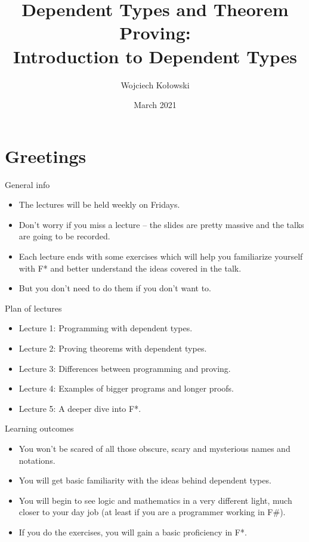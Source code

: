 \documentclass{beamer}
\title{Dependent Types and Theorem Proving: \\Introduction to Dependent Types}
\author{Wojciech Kołowski}
\date{March 2021}
\begin{document}
\frame{\titlepage}
\frame{\tableofcontents}

\section{Greetings}


\begin{frame}{General info}
\begin{itemize}
	\item The lectures will be held weekly on Fridays.
	\item Don't worry if you miss a lecture -- the slides are pretty massive and the talks are going to be recorded.
	\item Each lecture ends with some exercises which will help you familiarize yourself with F* and better understand the ideas covered in the talk.
	\item But you don't need to do them if you don't want to.
\end{itemize}
\end{frame}

\begin{frame}{Plan of lectures}
\begin{itemize}
	\item Lecture 1: Programming with dependent types.
	\item Lecture 2: Proving theorems with dependent types.
	\item Lecture 3: Differences between programming and proving.
	\item Lecture 4: Examples of bigger programs and longer proofs.
	\item Lecture 5: A deeper dive into F*.
\end{itemize}
\end{frame}


\begin{frame}{Learning outcomes}
\begin{itemize}
	\item You won't be scared of all those obscure, scary and mysterious names and notations.
	\item You will get basic familiarity with the ideas behind dependent types.
	\item You will begin to see logic and mathematics in a very different light, much closer to your day job (at least if you are a programmer working in F\#).
	\item If you do the exercises, you will gain a basic proficiency in F*.
\end{itemize}
\end{frame}
\end{document}
